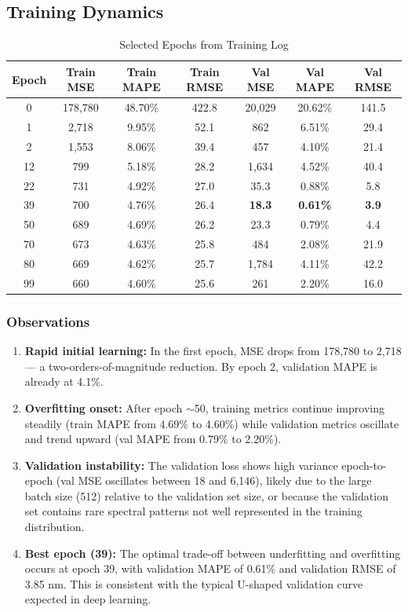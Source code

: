 \documentclass[11pt,a4paper]{article}
\begin{document}
\subsection{Training Dynamics}

\begin{table}[H]
\centering
\caption{Selected Epochs from Training Log}
\begin{tabular}{ccccccc}
\toprule
\textbf{Epoch} & \textbf{Train MSE} & \textbf{Train MAPE} & \textbf{Train RMSE} & \textbf{Val MSE} & \textbf{Val MAPE} & \textbf{Val RMSE} \\
\midrule
0  & 178,780 & 48.70\% & 422.8 & 20,029  & 20.62\% & 141.5 \\
1  & 2,718   & 9.95\%  & 52.1  & 862     & 6.51\%  & 29.4  \\
2  & 1,553   & 8.06\%  & 39.4  & 457     & 4.10\%  & 21.4  \\
12 & 799     & 5.18\%  & 28.2  & 1,634   & 4.52\%  & 40.4  \\
22 & 731     & 4.92\%  & 27.0  & 35.3    & 0.88\%  & 5.8   \\
39 & 700     & 4.76\%  & 26.4  & \textbf{18.3} & \textbf{0.61\%} & \textbf{3.9} \\
50 & 689     & 4.69\%  & 26.2  & 23.3    & 0.79\%  & 4.4   \\
70 & 673     & 4.63\%  & 25.8  & 484     & 2.08\%  & 21.9  \\
80 & 669     & 4.62\%  & 25.7  & 1,784   & 4.11\%  & 42.2  \\
99 & 660     & 4.60\%  & 25.6  & 261     & 2.20\%  & 16.0  \\
\bottomrule
\end{tabular}
\end{table}

\subsubsection*{Observations}

\begin{enumerate}
    \item \textbf{Rapid initial learning:} In the first epoch, MSE drops from 178,780 to 2,718 — a two-orders-of-magnitude reduction. By epoch 2, validation MAPE is already at 4.1\%.
    \item \textbf{Overfitting onset:} After epoch $\sim$50, training metrics continue improving steadily (train MAPE from 4.69\% to 4.60\%) while validation metrics oscillate and trend upward (val MAPE from 0.79\% to 2.20\%).
    \item \textbf{Validation instability:} The validation loss shows high variance epoch-to-epoch (val MSE oscillates between 18 and 6,146), likely due to the large batch size (512) relative to the validation set size, or because the validation set contains rare spectral patterns not well represented in the training distribution.
    \item \textbf{Best epoch (39):} The optimal trade-off between underfitting and overfitting occurs at epoch 39, with validation MAPE of 0.61\% and validation RMSE of 3.85 nm. This is consistent with the typical U-shaped validation curve expected in deep learning.
\end{enumerate}
\end{document}
